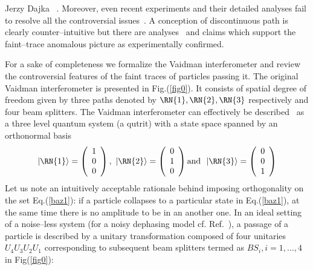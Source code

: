 \begin{artengenv}{Jerzy Dajka}
~\parencite{PhysRevA.91.012103,PhysRevA.93.036103,PhysRevA.92.023829,PhysRevA.93.017801, Hashmi_2016,Vaidman_2018,Hashmi_2018,elitzur}. Moreover, even recent experiments and their detailed analyses fail to resolve all the controversial issues~\parencite{PhysRevLett.111.240402,10.3389/fphy.2015.00047,10.3389/fphy.2015.00048,Sponar_2019,PhysRevA.95.042121,PhysRevA.97.052111, PhysRevA.97.052111,PhysRevA.89.033825,elitzur,WIESNIAK20182565}.  
A conception of
discontinuous path is clearly counter--intuitive but there are analyses~\parencite{e20110854,PhysRevA.101.052119} and claims which support the faint--trace anomalous picture as experimentally confirmed.  


For a sake of completeness we formalize the Vaidman interferometer and review the controversial features of the faint traces of particles passing it. The original Vaidman interferometer is presented in Fig.(\ref{fig0}). It consists of spatial degree of freedom given by three paths denoted by $\RN{1},\RN{2},\RN{3}$ respectively and four beam splitters. The Vaidman interferometer can effectively be described~\parencite{PhysRevA.96.022126,PhysRevA.99.026103,PhysRevA.99.026104,scirep} as a three level quantum system (a qutrit) with a state space spanned by an orthonormal basis
%
\begin{equation}\label{baz1}
|\RN{1}\rangle=\left(\begin{array}{c} 1 \\ 0 \\ 0   
\end{array}\right),\,\,|\RN{2}\rangle=\left(\begin{array}{c} 0 \\ 1 \\ 0   
\end{array}\right)  \mbox{and}\,\,\,\, |\RN{3}\rangle=\left(\begin{array}{c} 0 \\ 0 \\ 1   
\end{array}\right)
\end{equation}
%
Let us note an intuitively acceptable rationale behind imposing orthogonality on the set Eq.(\ref{baz1}): if a particle collapses to a particular state in Eq.(\ref{baz1}), at the same time there is no amplitude to be in an another one.  
%
In an ideal setting of a noise--less system (for a noisy dephasing model cf. Ref.~\parencite{scirep}), a passage of a particle is described by a unitary transformation composed of four unitaries $U_4U_3U_2U_1$ corresponding to subsequent beam splitters termed as $BS_{i}, i=1, \ldots, 4$ in Fig(\ref{fig0}):

\end{artengenv}

